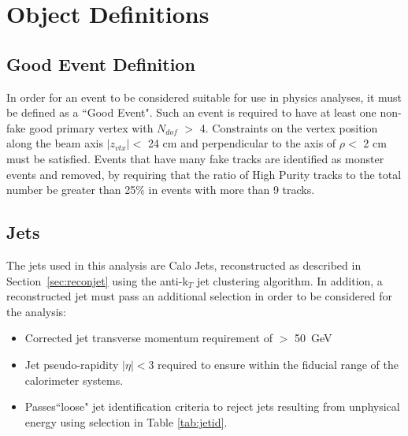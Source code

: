 \section{Object Definitions}
\subsection{Good Event Definition}
\label{sec:good}
In order for an event to be considered suitable for use in physics analyses, it must be defined as a ``Good Event". Such an event is required to have at least one non-fake good primary vertex with $N_{dof}$ $>$ 4. Constraints on the vertex position along the beam axis $|z_{vtx}| <$ 24 cm and perpendicular to the axis of $\rho <$ 2 cm must be satisfied. Events that have many fake tracks are identified as monster events and removed, by requiring that the ratio of High Purity tracks to the total number be greater than 25\% in events with more than 9 tracks.


\subsection{Jets}
\label{sec:jetsel}
The jets used in this analysis are Calo Jets, reconstructed as described in Section~\ref{sec:reconjet} using the anti-k$_{T}$ jet clustering algorithm. In addition, a reconstructed jet must pass an additional selection in order to be considered for the analysis:
\begin{itemize}
\item Corrected jet transverse momentum requirement of \Pt $>$ 50~GeV
\item Jet pseudo-rapidity $|\eta| < 3$ required to ensure within the fiducial range of the calorimeter systems.
\item Passes``loose" jet identification criteria to reject jets resulting from unphysical energy using selection in Table \ref{tab:jetid}.
\end{itemize}

